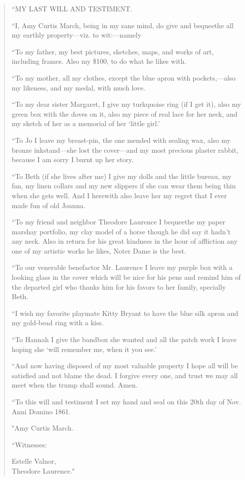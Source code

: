 \begin{quote}
``MY LAST WILL AND TESTIMENT.

``I, Amy Curtis March, being in my sane mind, do give and bequeethe all
my earthly property---viz. to wit:---namely

``To my father, my best pictures, sketches, maps, and works of art,
including frames. Also my \$100, to do what he likes with.

``To my mother, all my clothes, except the blue apron with
pockets,---also my likeness, and my medal, with much love.

``To my dear sister Margaret, I give my turkquoise ring (if I get it),
also my green box with the doves on it, also my piece of real lace for
her neck, and my sketch of her as a memorial of her
`little girl.'

``To Jo I leave my breast-pin, the one mended with sealing wax, also my
bronze inkstand---she lost the cover---and my most precious plaster
rabbit, because I am sorry I burnt up her story.

``To Beth (if she lives after me) I give my dolls and the little bureau,
my fan, my linen collars and my new slippers if she can wear them being
thin when she gets well. And I herewith also leave her my regret that I
ever made fun of old Joanna.

``To my friend and neighbor Theodore Laurence I bequeethe my paper
marshay portfolio, my clay model of a horse though he did say it
hadn't any neck. Also in return for his great kindness
in the hour of affliction any one of my artistic works he likes, Noter
Dame is the best.

``To our venerable benefactor Mr. Laurence I leave my purple box with a
looking glass in the cover which will be nice for his pens and remind
him of the departed girl who thanks him for his favors to her family,
specially Beth.

``I wish my favorite playmate Kitty Bryant to have the blue silk apron
and my gold-bead ring with a kiss.

``To Hannah I give the bandbox she wanted and all the patch work I leave
hoping she `will remember me, when it you
see.'

``And now having disposed of my most valuable property I hope all will be
satisfied and not blame the dead. I forgive every one, and trust we may
all meet when the trump shall sound. Amen.

``To this will and testiment I set my hand and seal on this 20th day of
Nov. Anni Domino 1861.

"{Amy Curtis March.}

``Witnesses: \raggedright
Estelle Valnor,\\
Theodore Laurence."\strut
\end{quote}


